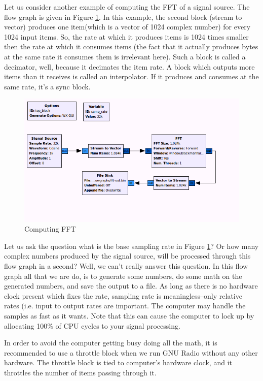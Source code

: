 \documentclass[a4paper,10pt]{report}
\begin{document}
Let us consider another example of computing the FFT of a signal source.
The flow graph is given in Figure \ref{fig:compute-fft}.
In this example, the second block (stream to vector) produces one item(which is a vector of 1024 complex number) for every 1024 input items.
So, the rate at which it produces items is 1024 times smaller then the rate at which it consumes items 
(the fact that it actually produces bytes at the same rate it consumes them is irrelevant here).
Such a block is called a decimator, well, because it decimates the item rate. 
A block which outputs more items than it receives is called an interpolator. 
If it produces and consumes at the same rate, it's a sync block.
\begin{figure}
 \centering
 \includegraphics[scale=0.4]{figures/fft.png}
 \caption{Computing FFT \label{fig:compute-fft}}
\end{figure}

Let us ask the question what is the base sampling rate in Figure \ref{fig:compute-fft}?
Or how many complex numbers produced by the signal source, will be processed through this flow graph in a second?
Well, we can't really answer this question.
In this flow graph all that we are do, is to generate some numbers, do some math on the generated numbers, and save the output to a file.
As long as there is no hardware clock present which fixes the rate, 
sampling rate is meaningless--only relative rates (i.e. input to output rates are important. 
The computer may handle the samples as fast as it wants.
Note that this can cause the computer to lock up by allocating 100\% of CPU cycles to your signal processing.

In order to avoid the computer getting busy doing all the math, it is recommended to use a throttle block
when we run GNU Radio without any other hardware. The throttle block is tied to computer's hardware clock,
and it throttles the number of items passing through it.
\end{document}
